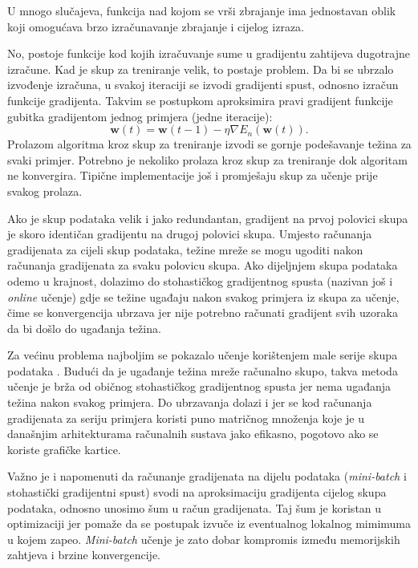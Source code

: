 \documentclass[times, utf8, diplomski, numeric]{fer}
\begin{document}
U mnogo slučajeva, funkcija nad kojom se vrši zbrajanje ima jednostavan oblik koji omogućava brzo izračunavanje zbrajanje i cijelog izraza.

No, postoje funkcije kod kojih izračuvanje sume u gradijentu zahtijeva dugotrajne izračune. Kad je skup za treniranje velik, to postaje problem. Da bi se ubrzalo izvođenje izračuna, u svakoj iteraciji se izvodi gradijenti spust, odnosno izračun funkcije gradijenta. Takvim se postupkom aproksimira pravi gradijent funkcije gubitka gradijentom jednog primjera (jedne iteracije):
\begin{equation}
    \boldsymbol{w}(t) = \boldsymbol{w}(t-1) - \eta \nabla E_n(\boldsymbol{w}(t)).
\end{equation}
Prolazom algoritma kroz skup za treniranje izvodi se gornje podešavanje težina za svaki primjer. Potrebno je nekoliko prolaza kroz skup za treniranje dok algoritam ne konvergira. Tipične implementacije još i promješaju skup za učenje prije svakog prolaza.

Ako je skup podataka velik i jako redundantan, gradijent na prvoj polovici skupa je skoro identičan gradijentu na drugoj polovici skupa. Umjesto računanja gradijenata za cijeli skup podataka, težine mreže se mogu ugoditi nakon računanja gradijenata za svaku polovicu skupa. Ako dijeljnjem skupa podataka odemo u krajnost, dolazimo do stohastičkog gradijentnog spusta (nazivan još i \emph{online} učenje) gdje se težine ugađaju nakon svakog primjera iz skupa za učenje, čime se konvergencija ubrzava jer nije potrebno računati gradijent svih uzoraka da bi došlo do ugađanja težina.

Za većinu problema najboljim se pokazalo učenje korištenjem male serije skupa podataka . Budući da je ugađanje težina mreže računalno skupo, takva metoda učenje je brža od običnog stohastičkog gradijentnog spusta jer nema ugađanja težina nakon svakog primjera. Do ubrzavanja dolazi i jer se kod računanja gradijenata za seriju primjera koristi puno matričnog množenja koje je u današnjim arhitekturama računalnih sustava jako efikasno, pogotovo ako se koriste grafičke kartice.

Važno je i napomenuti da računanje gradijenata na dijelu podataka (\textit{mini-batch} i stohastički gradijentni spust) svodi na aproksimaciju gradijenta cijelog skupa podataka, odnosno unosimo šum u račun gradijenata.
Taj šum je koristan u optimizaciji jer pomaže da se postupak izvuče iz eventualnog lokalnog mimimuma u kojem zapeo. \textit{Mini-batch} učenje je zato dobar kompromis između memorijskih zahtjeva i brzine konvergencije.
\end{document}
